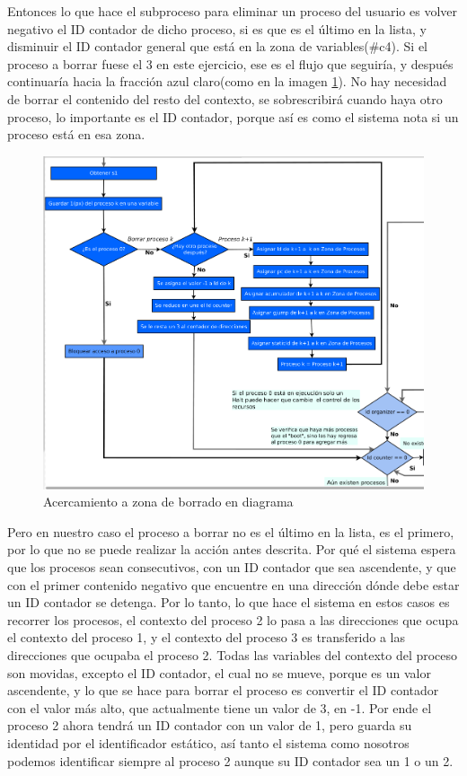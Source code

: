 \documentclass[letterpaper,12pt,oneside]{book}
\begin{document}
		Entonces lo que hace el subproceso para eliminar un proceso del usuario es volver negativo el ID contador de dicho proceso,
		si es que es el último en la lista, y disminuir el ID contador general que está en la zona de variables(\#c4). Si el proceso a borrar 
		fuese el 3 en este ejercicio, ese es el flujo que seguiría, y después continuaría hacia la fracción azul claro(como en la imagen 
		\ref{fig:diagZonaBorrado}). No hay necesidad 
		de borrar el contenido del resto
		del contexto, se sobrescribirá cuando haya otro proceso, lo importante es el ID contador, porque así es como el sistema nota
		si un proceso está en esa zona.
		
		
		\begin{figure}[h]		
			\centering
			\includegraphics[scale=0.45]{media/CARDIACC/diagZOnaBorrado.png}
			\caption{ Acercamiento a zona de borrado en diagrama}
			\label{fig:diagZonaBorrado}
		\end{figure}
		
		Pero en nuestro caso el proceso a borrar no es el último en la lista, es el primero, por lo que no se puede realizar la acción antes
		descrita. Por qué el sistema espera que los procesos sean consecutivos, con un ID contador que sea ascendente, y que con el
		primer contenido negativo que encuentre en una dirección dónde debe estar un ID contador se detenga. Por lo tanto, lo que hace el sistema
		en estos casos
		es recorrer los procesos, el contexto del proceso 2 lo pasa a las direcciones que ocupa el contexto del proceso 1, y el contexto del proceso
		3 es transferido a las direcciones que ocupaba el proceso 2. Todas las variables del contexto del proceso son movidas, excepto el ID contador, el
		cual no se mueve, porque es un valor ascendente, y lo que se hace para borrar el proceso es convertir el ID contador con el valor más 
		alto, que actualmente tiene
		un valor de 3, en -1. Por ende el proceso 2 ahora tendrá un ID contador con un valor de 1, pero guarda
		su identidad por el identificador estático, así tanto el sistema como nosotros podemos identificar siempre al proceso 2 aunque su
		ID contador sea un 1 o un 2.
		
\end{document}

